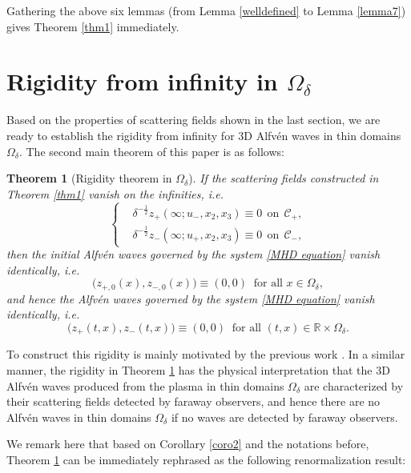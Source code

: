 \documentclass[10pt,reqno]{amsart}
\numberwithin{equation}{section}
\newtheorem{theorem}{Theorem}[section]
\begin{document}
Gathering the above six lemmas  (from Lemma \ref{welldefined} to Lemma \ref{lemma7}) gives Theorem \ref{thm1} immediately. 
 


\section{Rigidity from infinity in $\Omega_{\delta}$}  
\label{sec:rigidity}


Based on the properties of scattering fields shown in the last section, we are  ready to establish the rigidity from infinity for 3D Alfv\'en waves in thin domains $\Omega_{\delta}$. The second main theorem of this paper is as follows:
\begin{theorem}[Rigidity theorem in  $\Omega_{\delta}$]\label{thm2}
If the scattering fields constructed in Theorem \ref{thm1} 
vanish on the infinities, i.e.
\[\begin{cases}
	&\delta^{-\frac{1}{2}}z_+(\infty;u_-,x_2,x_3)\equiv 0 \ \ \text{on} \ \ \mathcal{C}_+,\\
	&\delta^{-\frac{1}{2}}z_-(\infty;u_+,x_2,x_3)\equiv 0 \ \ \text{on} \ \ \mathcal{C}_-,
\end{cases}
\]
then the initial Alfv\'en waves governed by the system  \eqref{MHD equation} vanish identically, i.e.  \[\big(z_{+,0}(x),z_{-,0}(x)\big)\equiv(0,0)\ \text{ for all }x\in\Omega_\delta,\] and hence
the Alfv\'en waves  governed by the system  \eqref{MHD equation} vanish identically, i.e. \[\big(z_+(t,x),z_-(t,x)\big)\equiv(0,0)\  \text{ for all }(t,x)\in \mathbb{R}\times \Omega_\delta.\] 
\end{theorem}


To construct this rigidity is mainly motivated by the previous work \cite{Li-Yu}. 
In a similar manner, the rigidity in Theorem \ref{thm2} has the physical interpretation that the 3D Alfv\'en waves  produced from the plasma in thin domains  $\Omega_{\delta}$ are characterized by their scattering fields detected by faraway observers, and hence  there are no  Alfv\'en waves  
 in thin domains  $\Omega_{\delta}$ if no waves are detected by faraway observers. 
 
 
 We remark here that 
 based on Corollary \ref{coro2} and the notations before, Theorem \ref{thm2}  can  be immediately rephrased as the following renormalization result:
 
\end{document}
